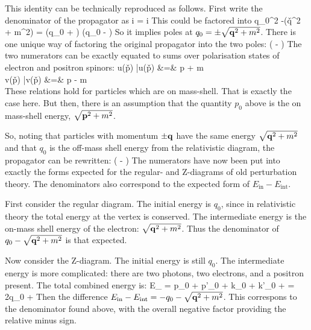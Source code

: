 This identity can be technically reproduced as follows.  First write the denominator of the propagator as
\beq
	i   = i 
\eeq
This could be factored into 
\beq
	q_0^2 -(\v{q}^2 + m^2) = (q_0 + )  (q_0 - )
\eeq
So it implies poles at $q_0 = \pm  \sqrt{\mathbf{q}^2 + m^2}$.  There is one unique way of factoring the original propagator into the two poles:
\beq
		\left(
			- 
		\right)
\eeq
The two numerators can be exactly equated to sums over polarisation states of electron and positron spinors:
\beqa
	\Sigma u(\v{p}) \bar{u}(\v{p}) &=& \gamma \cdot p + m	\\
	\Sigma v(\v{p}) \bar{v}(\v{p}) &=& \gamma \cdot p - m	\\
\eeqa
These relations hold for particles which are on mass-shell.  That is exactly the case here.  But then, there is an assumption that the quantity $p_0$ above is the on mass-shell energy, $\sqrt{\mathbf{p}^2 + m^2}$.

So, noting that particles with momentum $\pm \mathbf{q}$ have the same energy $\sqrt{\mathbf{q}^2 + m^2}$ and that $q_0$ is the off-mass shell energy from the relativistic diagram, the propagator can be rewritten:
\beq
		\left(
			- 
		\right)
\eeq
The numerators have now been put into exactly the forms expected for the regular- and Z-diagrams of old perturbation theory.  The denominators also correspond to the expected form of $E_\text{in} - E_\text{int}$.

First consider the regular diagram.  The initial energy is $q_0$, since in relativistic theory the total energy at the vertex is conserved.  The intermediate energy is the on-mass shell energy of the electron: $\sqrt{\mathbf{q}^2+ m^2}$.  Thus the denominator of $q_0 - \sqrt{\mathbf{q}^2+ m^2}$ is that expected.

Now consider the Z-diagram.  The initial energy is still $q_0$.  The intermediate energy is more complicated: there are two photons, two electrons, and a positron present.  The total combined energy is:
\beq
	E_ = p_0 + p'_0 + k_0 + k'_0 +  = 2q_0 +  
\eeq
Then the difference $E_\text{in} - E_\text{int} = -q_0 - \sqrt{\mathbf{q}^2 + m^2}$.  This correspons to the denominator found above, with the overall negative factor providing the relative minus sign.


